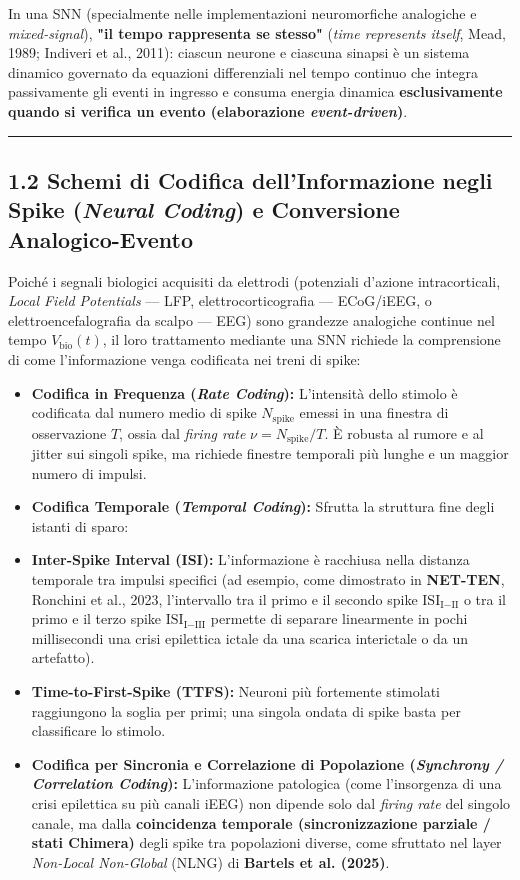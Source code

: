 \documentclass[11pt,a4paper]{article}
\begin{document}
In una SNN (specialmente nelle implementazioni neuromorfiche analogiche e \textit{mixed-signal}), \textbf{"il tempo rappresenta se stesso"} (\textit{time represents itself}, Mead, 1989; Indiveri et al., 2011): ciascun neurone e ciascuna sinapsi è un sistema dinamico governato da equazioni differenziali nel tempo continuo che integra passivamente gli eventi in ingresso e consuma energia dinamica \textbf{esclusivamente quando si verifica un evento (elaborazione \textit{event-driven})}.

\bigskip\hrule\bigskip

\subsection{1.2 Schemi di Codifica dell'Informazione negli Spike (\textit{Neural Coding}) e Conversione Analogico-Evento}

Poiché i segnali biologici acquisiti da elettrodi (potenziali d'azione intracorticali, \textit{Local Field Potentials} --- LFP, elettrocorticografia --- ECoG/iEEG, o elettroencefalografia da scalpo --- EEG) sono grandezze analogiche continue nel tempo $V_{\text{bio}}(t)$, il loro trattamento mediante una SNN richiede la comprensione di come l'informazione venga codificata nei treni di spike:

\begin{itemize}
  \item \textbf{Codifica in Frequenza (\textit{Rate Coding}):} L'intensità dello stimolo è codificata dal numero medio di spike $N_{\text{spike}}$ emessi in una finestra di osservazione $T$, ossia dal \textit{firing rate} $\nu = N_{\text{spike}} / T$. È robusta al rumore e al jitter sui singoli spike, ma richiede finestre temporali più lunghe e un maggior numero di impulsi.
  \item \textbf{Codifica Temporale (\textit{Temporal Coding}):} Sfrutta la struttura fine degli istanti di sparo:
  \item \textbf{Inter-Spike Interval (ISI):} L'informazione è racchiusa nella distanza temporale tra impulsi specifici (ad esempio, come dimostrato in \textbf{NET-TEN}, Ronchini et al., 2023, l'intervallo tra il primo e il secondo spike $\text{ISI}_{\text{I}-\text{II}}$ o tra il primo e il terzo spike $\text{ISI}_{\text{I}-\text{III}}$ permette di separare linearmente in pochi millisecondi una crisi epilettica ictale da una scarica interictale o da un artefatto).
  \item \textbf{Time-to-First-Spike (TTFS):} Neuroni più fortemente stimolati raggiungono la soglia per primi; una singola ondata di spike basta per classificare lo stimolo.
  \item \textbf{Codifica per Sincronia e Correlazione di Popolazione (\textit{Synchrony / Correlation Coding}):} L'informazione patologica (come l'insorgenza di una crisi epilettica su più canali iEEG) non dipende solo dal \textit{firing rate} del singolo canale, ma dalla \textbf{coincidenza temporale (sincronizzazione parziale / stati Chimera)} degli spike tra popolazioni diverse, come sfruttato nel layer \textit{Non-Local Non-Global} (NLNG) di \textbf{Bartels et al. (2025)}.
\end{itemize}
\end{document}
